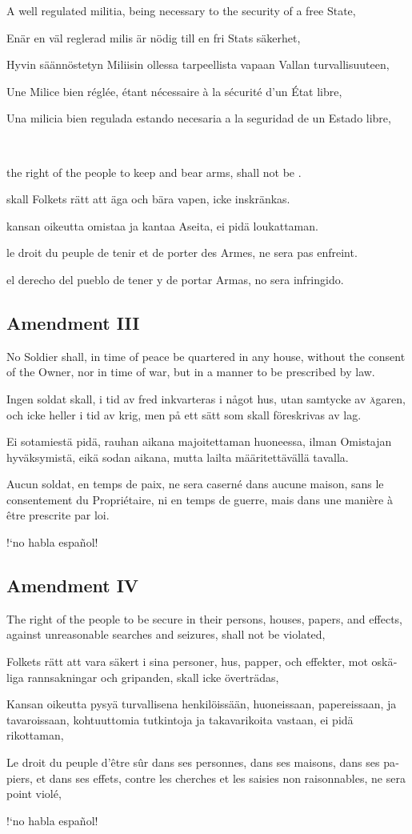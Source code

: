 \documentclass[a4paper,landscape,10pt]{article}
\newcommand{\tblock}[5]{\noindent\begin{minipage}[t]{0.18\textwidth}\foreignlanguage{english}{#1}\end{minipage}\hskip 0.025\textwidth\begin{minipage}[t]{0.18\textwidth}\foreignlanguage{swedish}{#2}\end{minipage}\hskip 0.025\textwidth\begin{minipage}[t]{0.18\textwidth}\foreignlanguage{finnish}{#3}\end{minipage}\hskip 0.025\textwidth\begin{minipage}[t]{0.18\textwidth}\foreignlanguage{french}{#4}\end{minipage}\hskip 0.025\textwidth\begin{minipage}[t]{0.18\textwidth}\foreignlanguage{spanish}{#5}\end{minipage}}
\begin{document}
\tblock
{A well regulated \Gls{militia}, being \gls{necessary} to the security of a free State,}
{Enär en väl reglerad milis är nödig till en fri Stats säkerhet,}
{Hyvin säännöstetyn Miliisin ollessa tarpeellista vapaan Vallan turvallisuuteen,}
{Une Milice bien réglée, étant nécessaire à la sécurité d'un État libre,}
{Una milicia bien regulada estando necesaria a la seguridad de un Estado libre,}

~

\tblock
{the right of the people to \gls{keep} and \gls{bear} \Glspl{arm}, shall not be \glsdisp{infringe}{infringed}.}
{skall Folkets rätt att äga och bära vapen, icke inskränkas.}
{kansan oikeutta omistaa ja kantaa Aseita, ei pidä loukattaman.}
{le droit du peuple de tenir et de porter des Armes, ne sera pas enfreint.}
{el derecho del pueblo de tener y de portar Armas, no sera infringido.}


\subsection*{Amendment III}
\tblock
{No Soldier shall, in time of peace be quartered in any house, without the consent of the Owner, nor in time of war, but in a manner to be prescribed by law.}
{Ingen soldat skall, i tid av fred inkvarteras i något hus, utan samtycke av \textsc{ä}garen, och icke heller i tid av krig, men på ett sätt som skall föreskrivas av lag.}
{Ei sotamiestä pidä, rauhan aikana majoitettaman huoneessa, ilman Omistajan hyväksymistä, eikä sodan aikana, mutta lailta määritettävällä tavalla.}
{Aucun soldat, en temps de paix, ne sera caserné dans aucune maison, sans le consentement du Propriétaire, ni en temps de guerre, mais dans une manière à être prescrite par loi.}
{!`no habla español!}

\subsection*{Amendment IV}
\tblock
{The right of the people to be secure in their persons, houses, papers, and effects, against unreasonable searches and seizures, shall not be violated,}
{Folkets rätt att vara säkert i sina personer, hus, papper, och effekter, mot oskäliga rannsakningar och gripanden, skall icke överträdas,}
{Kansan oikeutta pysyä turvallisena henkilöissään, huoneissaan, papereissaan, ja tavaroissaan, kohtuuttomia tutkintoja ja takavarikoita vastaan, ei pidä rikottaman,}
{Le droit du peuple d'être sûr dans ses personnes, dans ses maisons, dans ses papiers, et dans ses effets, contre les cherches et les saisies non raisonnables, ne sera point violé,}
{!`no habla español!}
\end{document}
